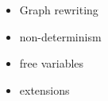 
\begin{itemize}
    \item Graph rewriting
    \item non-determinism
    \item free variables
    \item extensions
\end{itemize}
